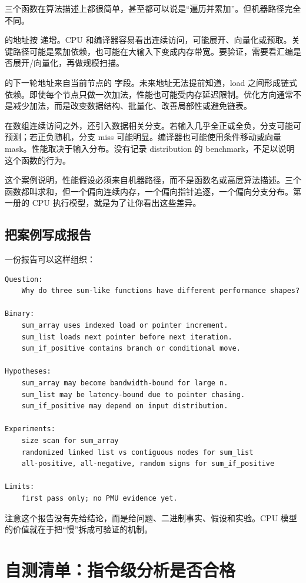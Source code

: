 三个函数在算法描述上都很简单，甚至都可以说是“遍历并累加”。但机器路径完全不同。

 的地址按  递增。CPU 和编译器容易看出连续访问，可能展开、向量化或预取。关键路径可能是累加依赖，也可能在大输入下变成内存带宽。要验证，需要看汇编是否展开/向量化，再做规模扫描。

 的下一轮地址来自当前节点的  字段。未来地址无法提前知道，load 之间形成链式依赖。即使每个节点只做一次加法，性能也可能受内存延迟限制。优化方向通常不是减少加法，而是改变数据结构、批量化、改善局部性或避免链表。

 在数组连续访问之外，还引入数据相关分支。若输入几乎全正或全负，分支可能可预测；若正负随机，分支 miss 可能明显。编译器也可能使用条件移动或向量 mask。性能取决于输入分布。没有记录 distribution 的 benchmark，不足以说明这个函数的行为。

这个案例说明，性能假设必须来自机器路径，而不是函数名或高层算法描述。三个函数都叫求和，但一个偏向连续内存，一个偏向指针追逐，一个偏向分支分布。第一册的 CPU 执行模型，就是为了让你看出这些差异。

\subsection{把案例写成报告}

一份报告可以这样组织：

\begin{lstlisting}
Question:
    Why do three sum-like functions have different performance shapes?

Binary:
    sum_array uses indexed load or pointer increment.
    sum_list loads next pointer before next iteration.
    sum_if_positive contains branch or conditional move.

Hypotheses:
    sum_array may become bandwidth-bound for large n.
    sum_list may be latency-bound due to pointer chasing.
    sum_if_positive may depend on input distribution.

Experiments:
    size scan for sum_array
    randomized linked list vs contiguous nodes for sum_list
    all-positive, all-negative, random signs for sum_if_positive

Limits:
    first pass only; no PMU evidence yet.
\end{lstlisting}

注意这个报告没有先给结论，而是给问题、二进制事实、假设和实验。CPU 模型的价值就在于把“慢”拆成可验证的机制。

\section{自测清单：指令级分析是否合格}

